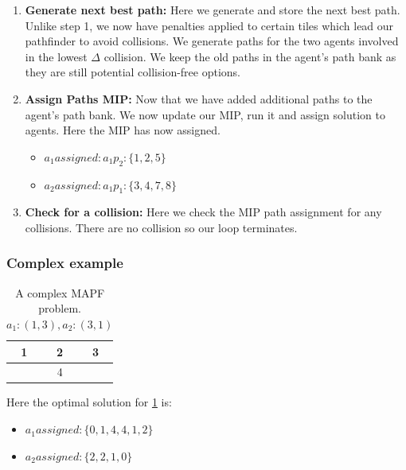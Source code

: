 \documentclass[a4paper,11pt]{article}
\begin{document}
\begin{enumerate}
	\item \textbf{Generate next best path:} Here we generate and store the next best path. Unlike step 1, we now have penalties applied to certain tiles which lead our pathfinder to avoid collisions. We generate paths for the two agents involved in the lowest $\Delta$ collision. We keep the old paths in the agent's path bank as they are still potential collision-free options.

	\item \textbf{Assign Paths MIP:} Now that we have added additional paths to the agent's path bank. We now update our MIP, run it and assign solution to agents. Here the MIP has now assigned.
	\begin{itemize}
		\item $a_1assigned: a_1p_2: \{1, 2, 5\}$
		\item $a_2assigned: a_1p_1: \{3, 4, 7, 8\}$
	\end{itemize}
	\item \textbf{Check for a collision:} Here we check the MIP path assignment for any collisions. There are no collision so our loop terminates.
\end{enumerate}


\newpage
\subsubsection{Complex example}
\begin{table}[h]
	\centering
	\footnotesize
	\begin{tabular}{|c|c|c|}
		\hline
		1 & 2 & 3 \\ \hline
		\cellcolor{black} & 4 & \cellcolor{black} \\ \hline
	\end{tabular}
	
	\caption{A complex MAPF problem. $a_1: (1, 3), a_2: (3, 1)$}
	\label{fig:complex-example}
\end{table}

Here the optimal solution for \ref{fig:complex-example} is:
\begin{itemize}
	\item $a_1assigned : \{0,1,4,4,1,2\}$
	\item $a_2assigned : \{2,2,1,0\}$
\end{itemize}
\end{document}
